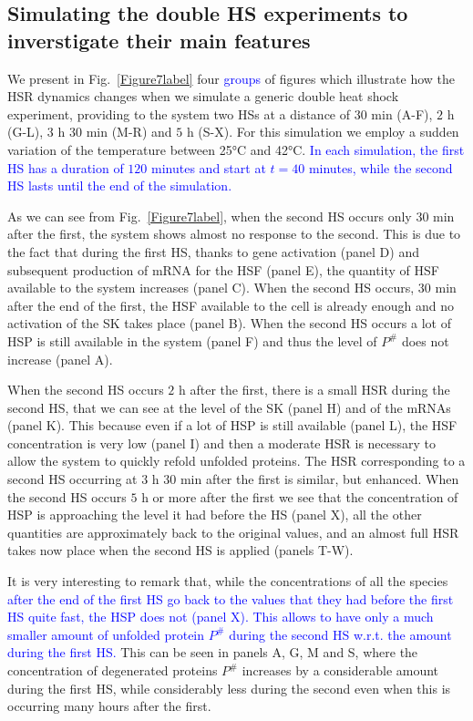 \documentclass[oneside, 10pt, a4paper, twocolumn]{article}
\begin{document}
\subsection{Simulating the double HS experiments to inverstigate their main features}
\label{Sec2HSsimulations}

We present in Fig.~\ref{Figure7label} four \textcolor{blue}{groups} of figures which illustrate how the HSR dynamics changes when we simulate a generic double heat shock experiment, providing to the system two HSs at a distance of $30$ min (A-F), $2$ h (G-L), $3$ h $30$ min (M-R) and $5$ h (S-X). For this simulation we employ a sudden variation of the temperature between 25°C and 42°C. \textcolor{blue}{In each simulation, the first HS has a duration of $120$ minutes and start at $t=40$ minutes, while the second HS lasts until the end of the simulation.}

As we can see from Fig.~\ref{Figure7label}, when the second HS occurs only $30$ min after the first, the system shows almost no response to the second. This is due to the fact that during the first HS, thanks to gene activation (panel D) and subsequent production of mRNA for the HSF (panel E), the quantity of HSF available to the system increases (panel C). When the second HS occurs, $30$ min after the end of the first, the HSF available to the cell is already enough and no activation of the SK takes place (panel B). When the second HS occurs a lot of HSP is still available in the system (panel F) and thus the level of $P^\#$ does not increase (panel A).

When the second HS occurs $2$ h after the first, there is a small HSR during the second HS, that we can see at the level of the SK (panel H) and of the mRNAs (panel K). This because even if a lot of HSP is still available (panel L), the HSF concentration is very low (panel I) and then a moderate HSR is necessary to allow the system to quickly refold unfolded proteins. 
The HSR corresponding to a second HS occurring at $3$ h $30$ min after the first is similar, but enhanced. 
When the second HS occurs $5$ h or more after the first we see that the concentration of HSP is approaching the level it had before the HS (panel X), all the other quantities are approximately back to the original values, and an almost full HSR takes now place when the second HS is applied (panels T-W). 

It is very interesting to remark that, while the concentrations of all the species \textcolor{blue}{after the end of the first HS go back to the values that they had before the first HS quite fast, the HSP does not (panel X). This allows to have only a much smaller amount of unfolded protein $P^\#$ during the second HS w.r.t. the amount during the first HS.} This can be seen in panels A, G, M and S, where the concentration of degenerated proteins $P^\#$ increases by a considerable amount during the first HS, while considerably less during the second even when this is occurring many hours after the first. %
\end{document}
